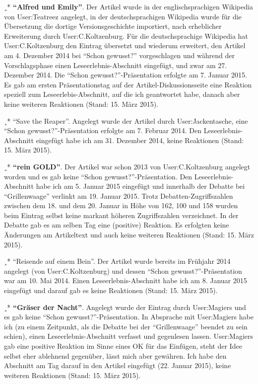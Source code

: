 \documentclass[fontsize=12pt]{scrartcl}
\begin{document}
¸* \textbf{"`Alfred und Emily"'}. Der Artikel wurde in der eng\-lischspra\-chi\-gen Wi\-ki\-pe\-dia von \mbox{User}:Teatreez angelegt, in der deutschspra\-chi\-gen Wi\-ki\-pe\-dia wurde f\"ur die \"Uberset\-zung die dortige Versionsgeschichte importiert, nach erheblicher Erweiterung durch \mbox{User}:C.Kolt\-zen\-burg. F\"ur die deutschspra\-chi\-ge Wi\-ki\-pe\-dia hat \mbox{User}:C.Kolt\-zen\-burg den Eintrag \"ubersetzt und wiederum erweitert, den Artikel am 4. Dezember 2014 bei "`Schon gewusst?"' vorgeschlagen und w\"ahrend der Vor\-schlags\-pha\-se einen Le\-se\-erleb\-nis-Ab\-schnitt eingef\"ugt, und zwar am 27. Dezember 2014. Die "`Schon gewusst?"'-Pr\"a\-sen\-ta\-tion erfolgte am 7. Januar 2015. Es gab am ersten Pr\"asentationstag auf der Artikel-Dis\-kus\-si\-onsseite eine Reaktion speziell zum Leseerlebis-Abschnitt, auf die ich geantwortet habe, danach aber keine weiteren Reaktionen (Stand: 15. M\"arz 2015).

¸* "`Save the Reaper"'. Angelegt wurde der Artikel durch \mbox{User}:Jackentasche, eine "`Schon gewusst?"'-Pr\"a\-sen\-ta\-tion erfolgte am 7. Februar 2014. Den Leseerlebnis-Ab\-schnitt eingef\"ugt habe ich am 31. Dezember 2014, keine Reaktionen (Stand: 15. M\"arz 2015).

¸* \textbf{"`rein GOLD"'}. Der Artikel war schon 2013 von \mbox{User}:C.Kolt\-zen\-burg angelegt worden und es gab keine "`Schon gewusst?"'-Pr\"asentation. Den Leseerlebnis-Abschnitt habe ich am 5. Januar 2015 eingef\"ugt und innerhalb der Debatte bei "`Grillenwaage"' verlinkt am 19. Januar 2015. Trotz Debatten-Zugriffszahlen zwischen dem 18.\,\,und dem 20.\,\,Januar in H\"ohe von 162, 100 und 158 wurden beim Eintrag \mbox{selbst} keine markant h\"oheren Zugriffszahlen verzeichnet. In der Debatte gab es am selben Tag eine (positive) Reaktion. Es erfolgten keine \"Anderungen am Artikeltext und auch keine weiteren Reaktionen (Stand: 15. M\"arz 2015).

¸* "`Reisende auf einem Bein"'. Der Artikel wurde bereits im Fr\"uhjahr 2014 angelegt (von \mbox{User}:C.Kolt\-zen\-burg) und dessen "`Schon gewusst?"'-Pr\"asentation war am 10. Mai 2014. Einen Leseerlebnis-Abschnitt habe ich am 8. Januar 2015 eingef\"ugt und darauf gab es keine Reaktionen (Stand: 15. M\"arz 2015).

¸* \textbf{"`Gr\"aser der Nacht"'}. Angelegt wurde der Eintrag durch \mbox{User}:Magiers und es gab keine "`Schon gewusst?"'-Pr\"asentation. In Absprache mit \mbox{User}:Magiers habe ich (zu einem Zeitpunkt, als die Debatte bei der "`Grillenwaage"' beendet zu sein schien), einen Leseerlebnis-Abschnitt verfasst und gegenlesen lassen. \mbox{User}:Magiers gab eine positive Reaktion im Sinne eines OK f\"ur das Einf\"ugen, steht der Idee \mbox{selbst} eher ablehnend gegen\"uber, l\"asst mich aber gew\"ahren. Ich habe den Abschnitt am Tag darauf in den Artikel eingef\"ugt (22. Januar 2015), keine weiteren Reaktionen (Stand: 15. M\"arz 2015).
\end{document}
